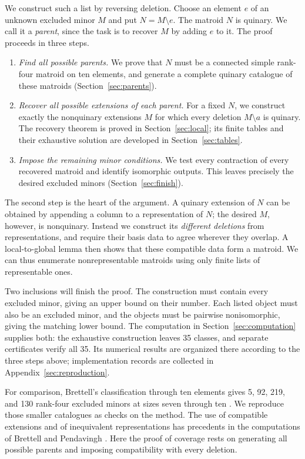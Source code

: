 \documentclass[11pt,a4paper]{article}
\theoremstyle{definition}
\begin{document}
We construct such a list by reversing deletion. Choose an element
$e$ of an unknown excluded minor $M$ and put $N=M\setminus e$. The
matroid $N$ is quinary. We call it a \emph{parent}, since the task is
to recover $M$ by adding $e$ to it. The proof proceeds in three steps.
\begin{enumerate}
\item \emph{Find all possible parents.} We prove that $N$ must be a
connected simple rank-four matroid on ten elements, and generate a
complete quinary catalogue of these matroids
(Section~\ref{sec:parents}).
\item \emph{Recover all possible extensions of each parent.} For a
fixed $N$, we construct exactly the nonquinary extensions $M$ for which
every deletion $M\setminus a$ is quinary. The recovery theorem is
proved in Section~\ref{sec:local}; its finite tables and their exhaustive
solution are developed in Section~\ref{sec:tables}.
\item \emph{Impose the remaining minor conditions.} We test every
contraction of every recovered matroid and identify isomorphic
outputs. This leaves precisely the desired excluded minors
(Section~\ref{sec:finish}).
\end{enumerate}

The second step is the heart of the argument. A quinary extension of
$N$ can be obtained by appending a column to a representation of $N$;
the desired $M$, however, is nonquinary. Instead we construct its
\emph{different deletions} from representations, and require their
basis data to agree wherever they overlap. A local-to-global lemma
then shows that these compatible data form a matroid. We can thus
enumerate nonrepresentable matroids using only finite lists of
representable ones.

Two inclusions will finish the proof. The construction must contain
every excluded minor, giving an upper bound on their number. Each
listed object must also be an excluded minor, and the objects must be
pairwise nonisomorphic, giving the matching lower bound. The
computation in Section~\ref{sec:computation} supplies both: the
exhaustive construction leaves 35 classes, and separate certificates
verify all 35. Its numerical results are organized there according
to the three steps above; implementation records are collected in
Appendix~\ref{sec:reproduction}.

For comparison, Brettell's classification through ten elements gives
5, 92, 219, and 130 rank-four excluded minors at sizes seven through
ten \cite{brettell}. We reproduce those smaller catalogues as checks
on the method. The use of compatible extensions and of inequivalent
representations has precedents in the computations of Brettell and
Pendavingh \cite{brettell-pendavingh}. Here the proof of coverage rests
on generating all possible parents and imposing compatibility with
every deletion.
\end{document}
